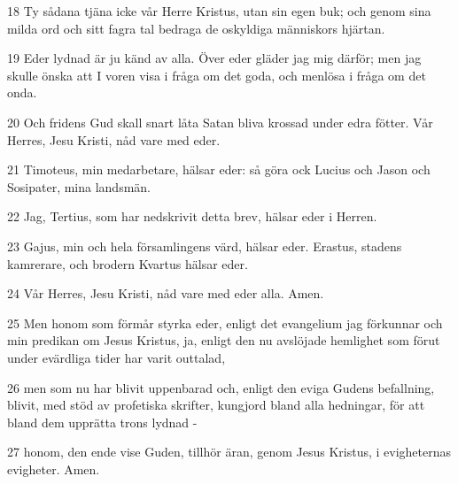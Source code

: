 \par 18 Ty sådana tjäna icke vår Herre Kristus, utan sin egen buk; och genom sina milda ord och sitt fagra tal bedraga de oskyldiga människors hjärtan.
\par 19 Eder lydnad är ju känd av alla. Över eder gläder jag mig därför; men jag skulle önska att I voren visa i fråga om det goda, och menlösa i fråga om det onda.
\par 20 Och fridens Gud skall snart låta Satan bliva krossad under edra fötter. Vår Herres, Jesu Kristi, nåd vare med eder.
\par 21 Timoteus, min medarbetare, hälsar eder: så göra ock Lucius och Jason och Sosipater, mina landsmän.
\par 22 Jag, Tertius, som har nedskrivit detta brev, hälsar eder i Herren.
\par 23 Gajus, min och hela församlingens värd, hälsar eder. Erastus, stadens kamrerare, och brodern Kvartus hälsar eder.
\par 24 Vår Herres, Jesu Kristi, nåd vare med eder alla. Amen.
\par 25 Men honom som förmår styrka eder, enligt det evangelium jag förkunnar och min predikan om Jesus Kristus, ja, enligt den nu avslöjade hemlighet som förut under evärdliga tider har varit outtalad,
\par 26 men som nu har blivit uppenbarad och, enligt den eviga Gudens befallning, blivit, med stöd av profetiska skrifter, kungjord bland alla hedningar, för att bland dem upprätta trons lydnad -
\par 27 honom, den ende vise Guden, tillhör äran, genom Jesus Kristus, i evigheternas evigheter. Amen.


